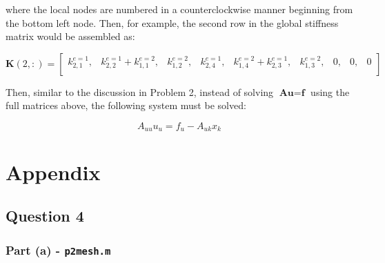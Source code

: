 \documentclass[10pt]{article}
\newcommand{\beq}{\begin{equation}}
\newcommand{\eeq}{\end{equation}}
\begin{document}
where the local nodes are numbered in a counterclockwise manner beginning from the bottom left node. Then, for example, the second row in the global stiffness matrix would be assembled as:

\begin{equation}
\textbf{K}(2,:)=\begin{bmatrix}
k_{2,1}^{e=1}, & k_{2,2}^{e=1}+k_{1,1}^{e=2}, & k_{1,2}^{e=2}, & k_{2,4}^{e=1}, & k_{1,4}^{e=2}+k_{2,3}^{e=1}, & k_{1,3}^{e=2}, & 0, & 0, & 0\\
\end{bmatrix}
\end{equation}

Then, similar to the discussion in Problem 2, instead of solving \(\textbf{A}\textbf{u}=\textbf{f}\) using the full matrices above, the following system must be solved:

\beq
A_{uu}u_u=f_u-A_{uk}x_k
\eeq


\section{Appendix}
\subsection{Question 4}
\subsubsection{Part (a) - {\tt p2mesh.m}}

\end{document}
